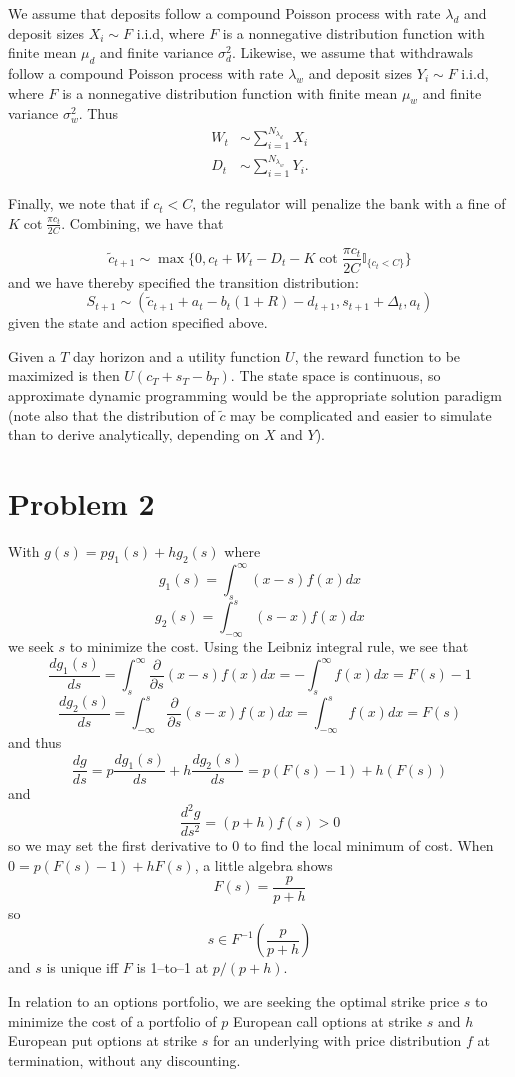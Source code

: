 \documentclass{article}
\begin{document}
We assume that deposits follow a compound Poisson process with rate $\lambda_d$ and deposit sizes $X_i \sim F$ i.i.d, where $F$ is a nonnegative distribution function with finite mean $\mu_d$ and finite variance $\sigma_d^2$. Likewise, we assume that withdrawals follow a compound Poisson process with rate $\lambda_w$ and deposit sizes $Y_i \sim F$ i.i.d, where $F$ is a nonnegative distribution function with finite mean $\mu_w$ and finite variance $\sigma_w^2$. Thus
\begin{align}
    W_t &\sim \sum_{i=1}^{N_{\lambda_d}} X_i\\
    D_t &\sim \sum_{i=1}^{N_{\lambda_w}} Y_i.
\end{align}

Finally, we note that if $c_t < C$, the regulator will penalize the bank with a fine of $K\cot\frac{\pi c_t}{2C}$. Combining, we have that 

\begin{equation}
    \tilde{c}_{t+1} \sim \max\{0, c_t + W_t - D_t - K\cot\frac{\pi c_t}{2C} \mathbb{I}_{\{c_t < C\}}\}
\end{equation}
and we have thereby specified the transition distribution: 
\begin{equation}
    S_{t+1} \sim (\tilde{c}_{t+1} + a_t - b_t(1+R) - d_{t+1}, s_{t+1} + \Delta_t, a_t)
\end{equation}
given the state and action specified above.

Given a $T$ day horizon and a utility function $U$, the reward function to be maximized is then $U(c_T + s_T - b_T)$. The state space is continuous, so approximate dynamic programming would be the appropriate solution paradigm (note also that the distribution of $\tilde{c}$ may be complicated and easier to simulate than to derive analytically, depending on $X$ and $Y$).

\section*{Problem 2}

With $g(s) = p g_1(s) + hg_2(s)$ where 
$$ g_1(s) = \int_s^\infty (x - s)f(x)dx $$
$$ g_2(s) = \int_{-\infty}^s (s - x)f(x)dx$$
we seek $s$ to minimize the cost. Using the Leibniz integral rule, we see that
$$ \frac{d g_1(s)}{ds} = \int_s^\infty \frac{\partial}{\partial s} (x-s)f(x) dx = - \int_s^\infty f(x) dx = F(s) - 1$$
$$\frac{d g_2(s)}{ds} = \int_{-\infty}^s \frac{\partial}{\partial s} (s - x) f(x) dx = \int_{-\infty}^s f(x) dx = F(s)$$
and thus
$$ \frac{dg}{ds} = p \frac{dg_1(s)}{ds} + h \frac{dg_2(s)}{ds} = p(F(s) - 1) + h(F(s))$$
and
$$\frac{d^2 g}{ds^2} = (p + h) f(s) > 0$$
so we may set the first derivative to 0 to find the local minimum of cost. When $0 = p (F(s) - 1) + h F(s)$, a little algebra shows
$$F(s) = \frac{p}{p+h}$$
so
$$ s \in F^{-1}\left(\frac{p}{p+h}\right)$$
and $s$ is unique iff $F$ is 1--to--1 at $p/(p+h)$.

In relation to an options portfolio, we are seeking the optimal strike price $s$ to minimize the cost of a portfolio of $p$ European call options at strike $s$ and $h$ European put options at strike $s$ for an underlying with price distribution $f$ at termination, without any discounting.
\end{document}
